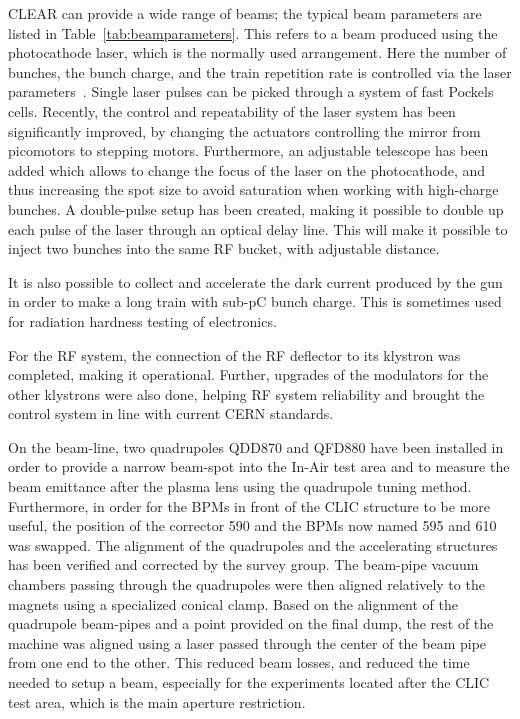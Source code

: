 \documentclass[a4paper,
               keeplastbox,   %
               ]{jacow}
\begin{document}
CLEAR can provide a wide range of beams; the typical beam parameters are listed in Table~\ref{tab:beamparameters}.
This refers to a beam produced using the photocathode laser, which is the normally used arrangement.
Here the number of bunches, the bunch charge, and the train repetition rate is controlled via the laser parameters~\cite{LucaGun,BrossardGun}.
Single laser pulses can be picked through a system of fast Pockels cells.
Recently, the control and repeatability of the laser system has been significantly improved, by changing the actuators controlling the mirror from picomotors to stepping motors.
Furthermore, an adjustable telescope has been added which allows to change the focus of the laser on the photocathode, and thus increasing the spot size to avoid saturation when working with high-charge bunches.
A double-pulse setup has been created, making it possible to double up each pulse of the laser through an optical delay line.
This will make it possible to inject two bunches into the same RF bucket, with adjustable distance.

It is also possible to collect and accelerate the dark current produced by the gun in order to make a long train with sub-pC bunch charge.
This is sometimes used for radiation hardness testing of electronics.

For the RF system, the connection of the RF deflector to its klystron was completed, making it operational.
Further, upgrades of the modulators for the other klystrons were also done, helping RF system reliability and brought the control system in line with current CERN standards.


On the beam-line, two quadrupoles QDD870 and QFD880 have been installed in order to provide a narrow beam-spot into the In-Air test area and to measure the beam emittance after the plasma lens using the quadrupole tuning method.
Furthermore, in order for the BPMs in front of the CLIC structure to be more useful, the position of the corrector 590 and the BPMs now named 595 and 610 was swapped.
The alignment of the quadrupoles and the accelerating structures has been verified and corrected by the survey group.
The beam-pipe vacuum chambers passing through the quadrupoles were then aligned relatively to the magnets using a specialized conical clamp.
Based on the alignment of the quadrupole beam-pipes and a point provided on the final dump, the rest of the machine was aligned using a laser passed through the center of the beam pipe from one end to the other.
This reduced beam losses, and reduced the time needed to setup a beam, especially for the experiments located after the CLIC test area, which is the main aperture restriction.
\end{document}
